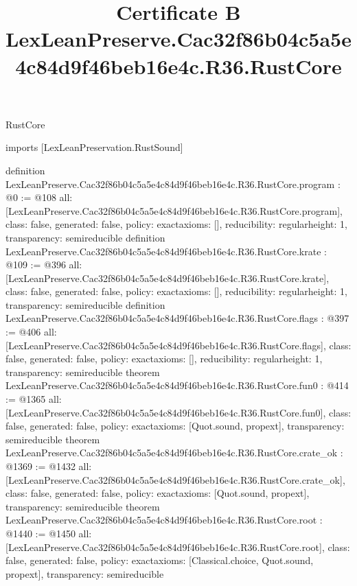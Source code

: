 \begin{lexlean}{RustCore}
\title{Certificate B LexLeanPreserve.Cac32f86b04c5a5e4c84d9f46beb16e4c.R36.RustCore}
\begin{coremodule}
imports [LexLeanPreservation.RustSound]

definition LexLeanPreserve.Cac32f86b04c5a5e4c84d9f46beb16e4c.R36.RustCore.program : @0 := @108 {
  all: [LexLeanPreserve.Cac32f86b04c5a5e4c84d9f46beb16e4c.R36.RustCore.program],
  class: false,
  generated: false,
  policy: exact{axioms: []},
  reducibility: regular{height: 1},
  transparency: semireducible
}
definition LexLeanPreserve.Cac32f86b04c5a5e4c84d9f46beb16e4c.R36.RustCore.krate : @109 := @396 {
  all: [LexLeanPreserve.Cac32f86b04c5a5e4c84d9f46beb16e4c.R36.RustCore.krate],
  class: false,
  generated: false,
  policy: exact{axioms: []},
  reducibility: regular{height: 1},
  transparency: semireducible
}
definition LexLeanPreserve.Cac32f86b04c5a5e4c84d9f46beb16e4c.R36.RustCore.flags : @397 := @406 {
  all: [LexLeanPreserve.Cac32f86b04c5a5e4c84d9f46beb16e4c.R36.RustCore.flags],
  class: false,
  generated: false,
  policy: exact{axioms: []},
  reducibility: regular{height: 1},
  transparency: semireducible
}
theorem LexLeanPreserve.Cac32f86b04c5a5e4c84d9f46beb16e4c.R36.RustCore.fun0 : @414 := @1365 {
  all: [LexLeanPreserve.Cac32f86b04c5a5e4c84d9f46beb16e4c.R36.RustCore.fun0],
  class: false,
  generated: false,
  policy: exact{axioms: [Quot.sound, propext]},
  transparency: semireducible
}
theorem LexLeanPreserve.Cac32f86b04c5a5e4c84d9f46beb16e4c.R36.RustCore.crate_ok : @1369 := @1432 {
  all: [LexLeanPreserve.Cac32f86b04c5a5e4c84d9f46beb16e4c.R36.RustCore.crate_ok],
  class: false,
  generated: false,
  policy: exact{axioms: [Quot.sound, propext]},
  transparency: semireducible
}
theorem LexLeanPreserve.Cac32f86b04c5a5e4c84d9f46beb16e4c.R36.RustCore.root : @1440 := @1450 {
  all: [LexLeanPreserve.Cac32f86b04c5a5e4c84d9f46beb16e4c.R36.RustCore.root],
  class: false,
  generated: false,
  policy: exact{axioms: [Classical.choice, Quot.sound, propext]},
  transparency: semireducible
}


\end{coremodule}
\end{lexlean}
